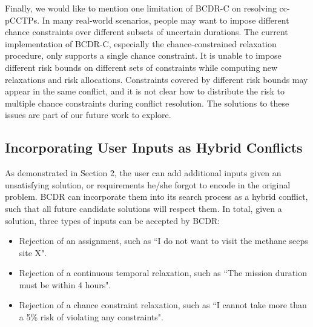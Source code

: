 \documentclass[jair,twoside,11pt,theapa]{article}
\begin{document}


Finally, we would like to mention one limitation of BCDR-C on resolving
cc-pCCTPs. In many real-world scenarios, people may want to impose different chance
constraints over different subsets of uncertain durations. The current
implementation of BCDR-C, especially the chance-constrained relaxation
procedure, only supports a single chance constraint. It is unable to impose
different risk bounds on different sets of constraints while computing new
relaxations and risk allocations. Constraints covered by different risk bounds
may appear in the same conflict, and it is not clear how to distribute the risk
to multiple chance constraints during conflict resolution. The solutions to
these issues are part of our future work to explore.


\subsection{Incorporating User Inputs as Hybrid Conflicts}  


As demonstrated in Section 2, the user can add additional inputs given an
unsatisfying solution, or requirements he/she forgot to encode in the original
problem. BCDR can incorporate them into its search process as a hybrid conflict,
such that all future candidate solutions will respect them. In total, given a
solution, three types of inputs can be accepted by BCDR:

\begin{itemize}
	
	
	\item Rejection of an assignment, such as ``I do not want to visit the methane seeps
	site X".
	
	
	\item Rejection of a continuous temporal relaxation, such as ``The mission duration must be
	within 4 hours".
	
	
	\item Rejection of a chance constraint relaxation, such as ``I cannot take more
	than a 5\% risk of violating any constraints".
	
\end{itemize}
\end{document}
